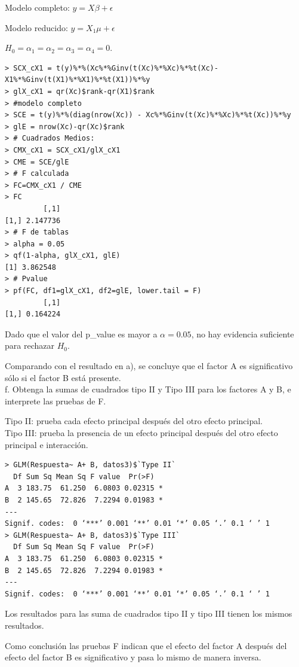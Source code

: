 \documentclass[12pt,a4paper]{report}
\begin{document}
Modelo completo: $y=X\beta+\epsilon$

Modelo reducido: $y=X_1 \mu +\epsilon$

$H_0 = \alpha_1 = \alpha_2 = \alpha_3 = \alpha_4 = 0$.

\begin{verbatim}
> SCX_cX1 = t(y)%*%(Xc%*%Ginv(t(Xc)%*%Xc)%*%t(Xc)-X1%*%Ginv(t(X1)%*%X1)%*%t(X1))%*%y
> glX_cX1 = qr(Xc)$rank-qr(X1)$rank
> #modelo completo
> SCE = t(y)%*%(diag(nrow(Xc)) - Xc%*%Ginv(t(Xc)%*%Xc)%*%t(Xc))%*%y
> glE = nrow(Xc)-qr(Xc)$rank
> # Cuadrados Medios:
> CMX_cX1 = SCX_cX1/glX_cX1
> CME = SCE/glE
> # F calculada
> FC=CMX_cX1 / CME
> FC
         [,1]
[1,] 2.147736
> # F de tablas 
> alpha = 0.05
> qf(1-alpha, glX_cX1, glE)
[1] 3.862548
> # Pvalue
> pf(FC, df1=glX_cX1, df2=glE, lower.tail = F)
         [,1]
[1,] 0.164224
\end{verbatim}
Dado que el valor del p\_value es mayor a $\alpha =0.05$, no 
hay evidencia suficiente para rechazar $H_{0}$. 

Comparando con el resultado en a), se concluye que el factor A es significativo sólo si el factor B está presente.\\



 f. Obtenga la sumas de cuadrados tipo II y Tipo III para los factores A y B, e interprete las pruebas de F.

Tipo II: prueba cada efecto principal después del otro efecto principal.
\\

Tipo III: prueba la presencia de un efecto principal después del otro efecto principal e interacción.


\begin{verbatim}
> GLM(Respuesta~ A+ B, datos3)$`Type II`
  Df Sum Sq Mean Sq F value  Pr(>F)  
A  3 183.75  61.250  6.0803 0.02315 *
B  2 145.65  72.826  7.2294 0.01983 *
---
Signif. codes:  0 ‘***’ 0.001 ‘**’ 0.01 ‘*’ 0.05 ‘.’ 0.1 ‘ ’ 1
> GLM(Respuesta~ A+ B, datos3)$`Type III`
  Df Sum Sq Mean Sq F value  Pr(>F)  
A  3 183.75  61.250  6.0803 0.02315 *
B  2 145.65  72.826  7.2294 0.01983 *
---
Signif. codes:  0 ‘***’ 0.001 ‘**’ 0.01 ‘*’ 0.05 ‘.’ 0.1 ‘ ’ 1

\end{verbatim}


Los resultados para las suma de cuadrados tipo II y tipo III tienen los mismos resultados.

Como conclusión las pruebas F indican que el efecto del factor A después del  efecto del factor B es significativo y pasa lo mismo de manera inversa.
\end{document}
